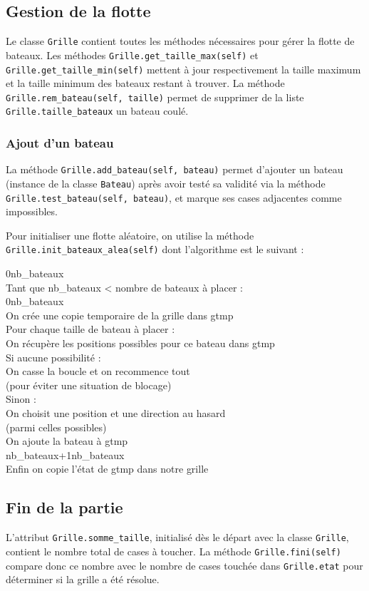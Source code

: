 \subsection{Gestion de la flotte}
Le classe \texttt{Grille} contient toutes les méthodes nécessaires pour gérer la flotte de bateaux. Les méthodes \texttt{Grille.get\_taille\_max(self)} et \texttt{Grille.get\_taille\_min(self)} mettent à jour respectivement la taille maximum et la taille minimum des bateaux restant à trouver. La méthode \texttt{Grille.rem\_bateau(self, taille)} permet de supprimer de la liste \texttt{Grille.taille\_bateaux} un bateau coulé.

\subsubsection{Ajout d'un bateau}
La méthode \texttt{Grille.add\_bateau(self, bateau)} permet d'ajouter un bateau (instance de la classe \texttt{Bateau}) après avoir testé sa validité via la méthode \texttt{Grille.test\_bateau(self, bateau)}, et marque ses cases adjacentes comme impossibles.

\medskip

Pour initialiser une flotte aléatoire, on utilise la méthode \texttt{Grille.init\_bateaux\_alea(self)} dont l'algorithme est le suivant :

\begin{algo1}
0\sto nb\_bateaux\\
Tant que nb\_bateaux < nombre de bateaux à placer :\\
 0\sto nb\_bateaux\\
 On crée une copie temporaire de la grille dans gtmp\\
 Pour chaque taille de bateau à placer :\\
 On récupère les positions possibles pour ce bateau dans gtmp\\
 Si aucune possibilité :\\
 On casse la boucle et on recommence tout\\
 (pour éviter une situation de blocage)\\
 Sinon :\\
 On choisit une position et une direction au hasard\\
 (parmi celles possibles)\\
 On ajoute la bateau à gtmp\\
 nb\_bateaux+1\sto nb\_bateaux\\
Enfin on copie l'état de gtmp dans notre grille \\
\end{algo1}

\subsection{Fin de la partie}
L'attribut \texttt{Grille.somme\_taille}, initialisé dès le départ avec la classe \texttt{Grille}, contient le nombre total de cases à toucher. La méthode \texttt{Grille.fini(self)} compare donc ce nombre avec le nombre de cases touchée dans \texttt{Grille.etat} pour déterminer si la grille a été résolue.